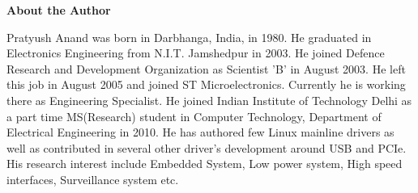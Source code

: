 \documentclass[a4paper, 12pt, twoside]{Thesis}  %
\begin{document}






\label{Bibliography}
%
\cleardoublepage


\huge\textbf{About the Author}

\begin{sloppypar}
\normalsize
Pratyush Anand was born in Darbhanga, India, in 1980. He graduated in
Electronics Engineering from N.I.T. Jamshedpur in 2003. He joined
Defence Research and Development Organization as Scientist 'B' in August
2003. He left this job in August 2005 and joined ST Microelectronics.
Currently he is working there as Engineering Specialist. He joined
Indian Institute of Technology Delhi as a part time MS(Research) student
in Computer Technology, Department of Electrical Engineering in 2010. He
has authored few Linux mainline drivers as well as contributed in
several other driver’s development around USB and PCIe. His research
interest include Embedded System, Low power system, High speed
interfaces, Surveillance system etc.
\end{sloppypar}
\end{document}
